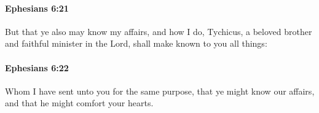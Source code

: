 		\paragraph{Ephesians 6:21} %
			\label{EPHESIANS-6-21}

			But that ye also may know my affairs, and how I do, Tychicus, a beloved brother and faithful minister in the Lord, shall make known to you all things:

			\begin{framed}
			\scriptsize
				\begin{compactdesc}
					\item[SBLG] 
				\end{compactdesc}
			\end{framed}

		\paragraph{Ephesians 6:22} %
			\label{EPHESIANS-6-22}

			Whom I have sent unto you for the same purpose, that ye might know our affairs, and that he might comfort your hearts.

